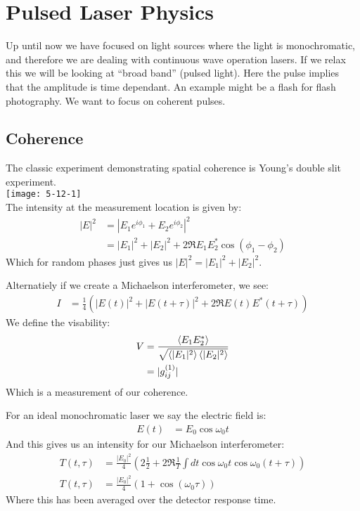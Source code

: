 \section{Pulsed Laser Physics}
Up until now we have focused on light sources where the light is monochromatic, and therefore we are dealing with continuous wave operation lasers.
If we relax this we will be looking at ``broad band'' (pulsed light). Here the pulse implies that the amplitude is time dependant.
An example might be a flash for flash photography. We want to focus on coherent pulses.
\subsection{Coherence}
The classic experiment demonstrating spatial coherence is Young's double slit experiment.\\
\texttt{[image: 5-12-1]}\\
The intensity at the measurement location is given by:
\begin{align*}
	|E|^2 &= |E_1 e^{i\phi_1} + E_2 e^{i\phi_2}|^2 \\
	&= |E_1|^2 + |E_2|^2 + 2\Re{E_1 E_2^* \cos(\phi_1-\phi_2)}
\end{align*}
Which for random phases just gives us $|E|^2 = |E_1|^2 + |E_2|^2$.

Alternatiely if we create a Michaelson interferometer, we see:
\begin{align*}
	I &= \frac{1}{4}\left(|E(t)|^2 + |E(t+\tau)|^2 + 2\Re{E(t)E^*(t+\tau)}\right)
\end{align*}
We define the visability:
\begin{align*}
	V &= \frac{\expval{E_1E_2^*}}{\sqrt{\expval{|E_1|^2}\expval{|E_2|^2}}} \\
	&= |g_{ij}^{(1)}|
\end{align*}
Which is a measurement of our coherence.

For an ideal monochromatic laser we say the electric field is:
\begin{align*}
	E(t) &= E_0 \cos\omega_0 t
\end{align*}
And this gives us an intensity for our Michaelson interferometer:
\begin{align*}
	T(t,\tau) &= \frac{|E_0|^2}{4}\left(2\frac{1}{2} + 2\Re{\frac{1}{T}\int dt \cos\omega_0 t\cos\omega_0(t+\tau)}\right) \\
	T(t,\tau) &= \frac{|E_0|^2}{4}\left(1 + \cos(\omega_0\tau)\right)
\end{align*}
Where this has been averaged over the detector response time.

